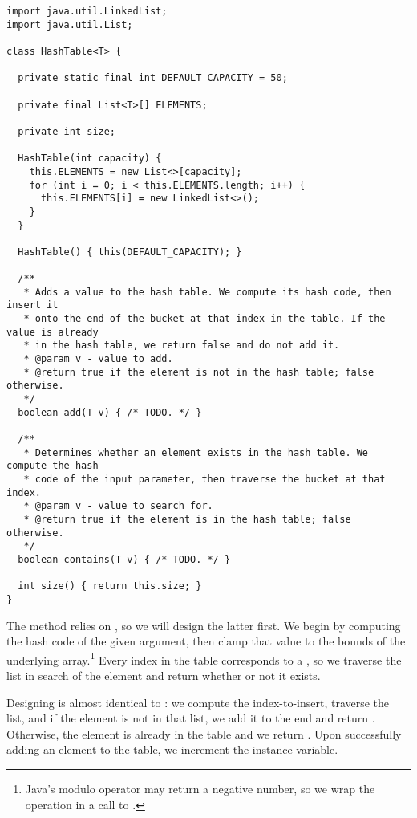 \begin{lstlisting}[language=MyJava]
import java.util.LinkedList;
import java.util.List;

class HashTable<T> {

  private static final int DEFAULT_CAPACITY = 50;

  private final List<T>[] ELEMENTS;

  private int size;

  HashTable(int capacity) {
    this.ELEMENTS = new List<>[capacity];
    for (int i = 0; i < this.ELEMENTS.length; i++) {
      this.ELEMENTS[i] = new LinkedList<>();
    }
  }

  HashTable() { this(DEFAULT_CAPACITY); }

  /**
   * Adds a value to the hash table. We compute its hash code, then insert it
   * onto the end of the bucket at that index in the table. If the value is already
   * in the hash table, we return false and do not add it.
   * @param v - value to add.
   * @return true if the element is not in the hash table; false otherwise.
   */
  boolean add(T v) { /* TODO. */ }

  /**
   * Determines whether an element exists in the hash table. We compute the hash
   * code of the input parameter, then traverse the bucket at that index.
   * @param v - value to search for.
   * @return true if the element is in the hash table; false otherwise.
   */
  boolean contains(T v) { /* TODO. */ }

  int size() { return this.size; }
}
\end{lstlisting}

The  method relies on , so we will design the latter first. We begin by computing the hash code of the given argument, then clamp that value to the bounds of the underlying array.\footnote{Java's modulo operator may return a negative number, so we wrap the operation in a call to .} Every index in the table corresponds to a , so we traverse the list in search of the element and return whether or not it exists.

Designing  is almost identical to : we compute the index-to-insert, traverse the list, and if the element is not in that list, we add it to the end and return . Otherwise, the element is already in the table and we return . Upon successfully adding an element to the table, we increment the  instance variable.

